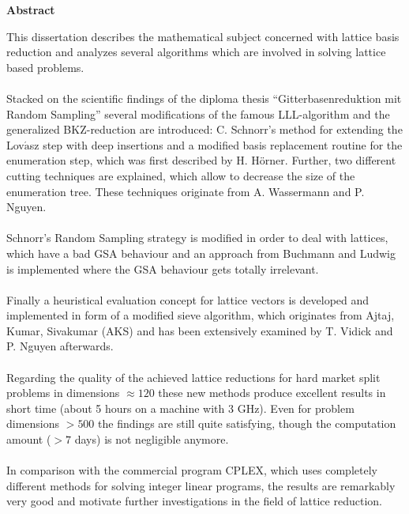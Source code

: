 \documentclass[11pt]{article}
\begin{document}
\centerline{\large \bf Abstract}
\vspace{5mm}
This dissertation describes the mathematical subject concerned with lattice basis reduction and analyzes several algorithms which are involved in solving lattice based problems.\\
\\
Stacked on the scientific findings of the diploma thesis “Gitterbasenreduktion mit Random Sampling” several modifications of the famous LLL-algorithm and the generalized BKZ-reduction are introduced: C. Schnorr's method for extending the Lov$\acute{\mbox{a}}$sz step with deep insertions and a modified basis replacement routine for the enumeration step, which was first described by H. Hörner. Further, two different cutting techniques are explained, which allow to decrease the size of the enumeration tree. These techniques originate from A. Wassermann and P. Nguyen.\\
\\
Schnorr's Random Sampling strategy is modified in order to deal with lattices, which have a bad GSA behaviour and an approach from Buchmann and Ludwig is implemented where the GSA behaviour gets totally irrelevant.\\
\\
Finally a heuristical evaluation concept for lattice vectors is developed and implemented in form of a modified sieve algorithm, which originates from Ajtaj, Kumar, Sivakumar (AKS) and has been extensively examined by T. Vidick and P. Nguyen afterwards.\\
\\
Regarding the quality of the achieved lattice reductions for hard market split problems in dimensions $\approx 120$ these new methods produce excellent results in short time (about 5 hours on a machine with 3 GHz). Even for problem dimensions $>500$ the findings are still quite satisfying, though the computation amount ($>7$ days) is not negligible anymore.\\
\\
In comparison with the commercial program CPLEX, which uses completely different methods for solving integer linear programs, the results are remarkably very good and motivate further investigations in the field of lattice reduction.
\end{document}
